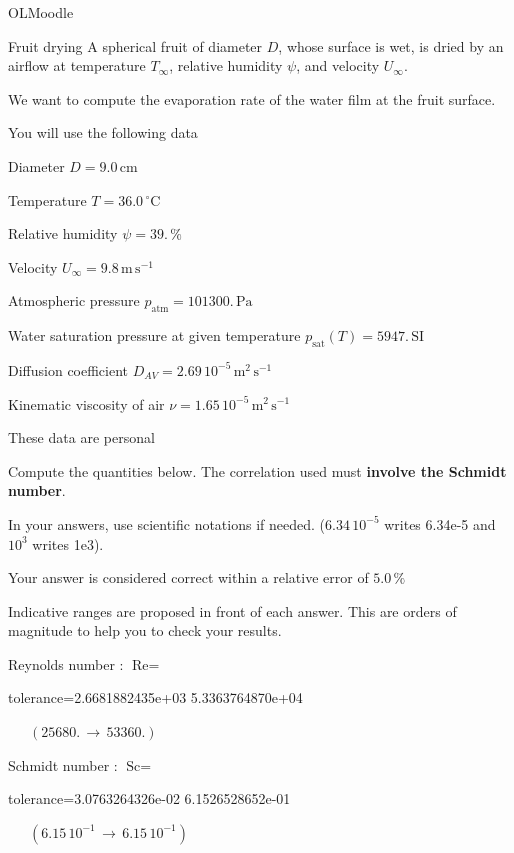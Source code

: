 \documentclass[12pt]{article}
\begin{document}
\begin{quiz}{OLMoodle} 

 \begin{cloze}{Fruit drying} 
A spherical fruit of diameter $D$, whose surface is wet, is dried by an airflow at temperature $T_\infty$, relative humidity $\psi$, and velocity $U_\infty$.

We want to compute the evaporation rate of the water film at the fruit surface.

 

You will use the following data

 

Diameter $D = 9.0\,  \mathrm{cm} $

Temperature $T = 36.0\,  \mathrm{^\circ\mathrm{C}} $

Relative humidity $\psi = 39.\, \% $

Velocity $U_\infty = 9.8\,  \mathrm{m}\,  \mathrm{s}^{-1} $

Atmospheric pressure $p_{\text{atm}} = 101300.\,  \mathrm{Pa} $

Water saturation pressure at given temperature $p_{\text{sat}}(T) = 5947.\,  \mathrm{SI} $

Diffusion coefficient $D_{AV} =  2.69 \, 10^{-5} \,  \mathrm{m}^{2}\,  \mathrm{s}^{-1} $

Kinematic viscosity of air $\nu =  1.65 \, 10^{-5} \,  \mathrm{m}^{2}\,  \mathrm{s}^{-1} $

These data are personal

 

Compute the quantities below. The correlation used must \textbf{involve the Schmidt number}.

In your answers, use scientific notations if needed.  ($6.34\, 10^{-5}$ writes 6.34e-5 and $10^{3}$ writes 1e3).

Your answer is considered correct within a relative error of $5.0\, \% $

Indicative ranges are proposed in front of each answer. This are orders of magnitude to help you to check your results.

 

Reynolds number : $\text{Re} =  $
\begin{numerical}[points=1] 
\item[tolerance={2.6681882435e+03}] 5.3363764870e+04 
\end{numerical} 
 $\,$ 
 $ \quad (25680. \, \rightarrow \, 53360.) $ 

Schmidt number : $\text{Sc} =  $
\begin{numerical}[points=1] 
\item[tolerance={3.0763264326e-02}] 6.1526528652e-01 
\end{numerical} 
 $\,$ 
 $ \quad ( 6.15 \, 10^{-1}  \, \rightarrow \,  6.15 \, 10^{-1} ) $ 


\end{cloze}
\end{quiz}
\end{document}

